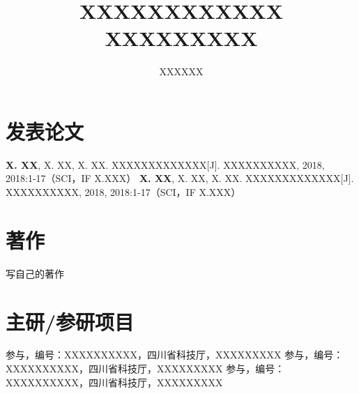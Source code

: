 \documentclass[doctor]{thesis-uestc}
\title{XXXXXXXXXXXX\\XXXXXXXXX}
\author{XXXXXX}
\begin{document}
\makecover




\thesistableofcontents
















%
% 
%
% 
% 
%

%

\begin{thesisachievement}
\setlength{\baselineskip}{20 pt}	%
\addtolength{\itemsep}{-2 ex}	%
\section*{发表论文}
\textbf{X. XX}, X. XX, X. XX. XXXXXXXXXXXXX[J]. XXXXXXXXXX, 2018, 2018:1-17（SCI，IF X.XXX）
\textbf{X. XX}, X. XX, X. XX. XXXXXXXXXXXXX[J]. XXXXXXXXXX, 2018, 2018:1-17（SCI，IF X.XXX）
\vspace{-5 pt}	%
\section*{著作}
写自己的著作
\section*{主研/参研项目}
 参与，编号：XXXXXXXXXX，四川省科技厅，XXXXXXXXX
 参与，编号：XXXXXXXXXX，四川省科技厅，XXXXXXXXX
 参与，编号：XXXXXXXXXX，四川省科技厅，XXXXXXXXX



\end{thesisachievement}

%
%
\end{document}
